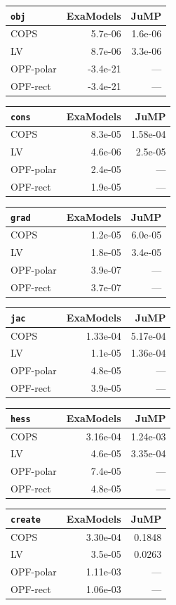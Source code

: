 \begin{tabular}{lrr}
  \hline
  \texttt{obj} & ExaModels & JuMP \\
  \hline
  COPS & 5.7e-06 & 1.6e-06 \\
  LV & 8.7e-06 & 3.3e-06 \\
  OPF-polar & -3.4e-21 & --- \\
  OPF-rect & -3.4e-21 & --- \\
  \hline
\end{tabular}

\begin{tabular}{lrr}
  \hline
  \texttt{cons} & ExaModels & JuMP \\
  \hline
  COPS & 8.3e-05 & 1.58e-04 \\
  LV & 4.6e-06 & 2.5e-05 \\
  OPF-polar & 2.4e-05 & --- \\
  OPF-rect & 1.9e-05 & --- \\
  \hline
\end{tabular}

\begin{tabular}{lrr}
  \hline
  \texttt{grad} & ExaModels & JuMP \\
  \hline
  COPS & 1.2e-05 & 6.0e-05 \\
  LV & 1.8e-05 & 3.4e-05 \\
  OPF-polar & 3.9e-07 & --- \\
  OPF-rect & 3.7e-07 & --- \\
  \hline
\end{tabular}

\begin{tabular}{lrr}
  \hline
  \texttt{jac} & ExaModels & JuMP \\
  \hline
  COPS & 1.33e-04 & 5.17e-04 \\
  LV & 1.1e-05 & 1.36e-04 \\
  OPF-polar & 4.8e-05 & --- \\
  OPF-rect & 3.9e-05 & --- \\
  \hline
\end{tabular}

\begin{tabular}{lrr}
  \hline
  \texttt{hess} & ExaModels & JuMP \\
  \hline
  COPS & 3.16e-04 & 1.24e-03 \\
  LV & 4.6e-05 & 3.35e-04 \\
  OPF-polar & 7.4e-05 & --- \\
  OPF-rect & 4.8e-05 & --- \\
  \hline
\end{tabular}

\begin{tabular}{lrr}
  \hline
  \texttt{create} & ExaModels & JuMP \\
  \hline
  COPS & 3.30e-04 & 0.1848 \\
  LV & 3.5e-05 & 0.0263 \\
  OPF-polar & 1.11e-03 & --- \\
  OPF-rect & 1.06e-03 & --- \\
  \hline
\end{tabular}

